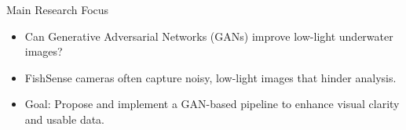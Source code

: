 


\begin{frame}{Main Research Focus}
    \begin{itemize}
        \item Can Generative Adversarial Networks (GANs) improve low-light underwater images?
        \item  FishSense cameras often capture noisy, low-light images that hinder analysis.
        \item Goal: Propose and implement a GAN-based pipeline to enhance visual clarity and usable data.
    \end{itemize}
\end{frame}


